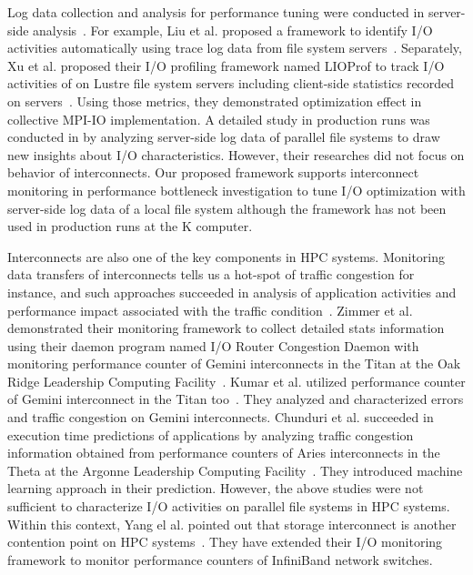 \documentclass{jhps}
\begin{document}
Log data collection and analysis for performance tuning were conducted in
server-side analysis~\cite{liu:fast2014,liu:sc16,xu:cug16,patel:sc19}.
For example, Liu et al. proposed a framework to identify I/O activities
automatically using trace log data from file system servers~\cite{liu:fast2014,liu:sc16}.
Separately, Xu et al. proposed their I/O profiling framework
named LIOProf to track I/O activities of on Lustre file system servers
including client-side statistics recorded on servers~\cite{xu:cug16}.
Using those metrics, they demonstrated optimization effect
in collective MPI-IO implementation.
A detailed study in production runs was conducted in \cite{patel:sc19}
by analyzing server-side log data of parallel file systems
to draw new insights about I/O characteristics.
However, their researches did not focus on behavior of interconnects.
Our proposed framework supports interconnect monitoring
in performance bottleneck investigation to tune I/O optimization
with server-side log data of a local file system
although the framework has not been used in production runs at the K computer.

Interconnects are also one of the key components in HPC systems.
Monitoring data transfers of interconnects tells us a hot-spot of traffic congestion
for instance, and such approaches succeeded in analysis of
application activities and performance impact associated with
the traffic condition~\cite{zimmer:cug16,kumar:DSN2018,chunduri:pmbs19,yang:nsdi2019}.
Zimmer et al. demonstrated their monitoring framework to collect detailed stats information
using their daemon program named I/O Router Congestion Daemon with monitoring
performance counter of Gemini interconnects in the Titan at the Oak Ridge Leadership
Computing Facility~\cite{zimmer:cug16}.
Kumar et al. utilized performance counter of Gemini interconnect
in the Titan too~\cite{kumar:DSN2018}.
They analyzed and characterized errors and traffic congestion on Gemini interconnects. 
Chunduri et al. succeeded in execution time predictions
of applications by analyzing traffic congestion information
obtained from performance counters of Aries interconnects in the Theta
at the Argonne Leadership Computing Facility~\cite{chunduri:pmbs19}.
They introduced machine learning approach in their prediction.
However, the above studies were not sufficient to characterize I/O activities
on parallel file systems in HPC systems.
Within this context, Yang el al. pointed out that storage interconnect is
another contention point on HPC systems~\cite{yang:nsdi2019}.
They have extended their I/O monitoring framework to monitor performance counters
of InfiniBand network switches.
\end{document}
